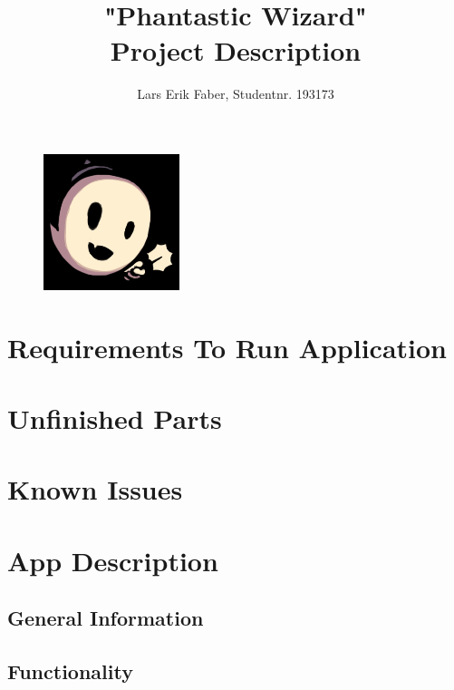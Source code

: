 \documentclass[12pt]{article}
\begin{document}
\title{%
    "Phantastic Wizard"\\
    \large Project Description}
\author{Lars Erik Faber, Studentnr. 193173}
\date{}
\maketitle

\begin{figure}[h!]
    \centering
    \includegraphics[scale=5.0]{images/logo.png}
\end{figure}

\newpage

\tableofcontents

\newpage

\section{Requirements To Run Application}

\section{Unfinished Parts}

\section{Known Issues}

\section{App Description}

    \subsection{General Information}

    \subsection{Functionality}

    
\end{document}
